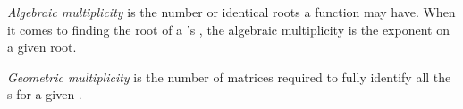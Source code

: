 \begin{definition}\label{def:Algebraic_Multiplicity}
  \emph{Algebraic multiplicity} is the number or identical roots a function may have.
  When it comes to finding the root of a 's , the algebraic multiplicity is the exponent on a given root.
\end{definition}

\begin{definition}\label{def:Geometric_Multiplicity}
  \emph{Geometric multiplicity} is the number of matrices required to fully identify all the s for a given .
\end{definition}


